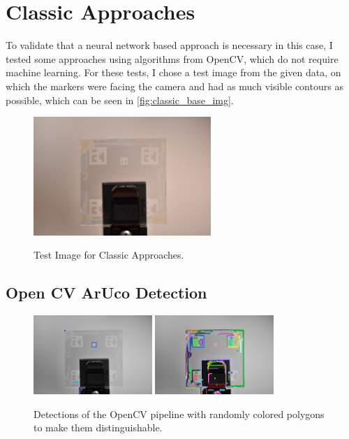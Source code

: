 \documentclass[10pt]{book}
\newcommand{\figureref}[1]{\autoref{#1}}
\begin{document}
\section{Classic Approaches}

To validate that a neural network based approach is necessary in this case, I tested some approaches using algorithms from \ac{OpenCV}, which do not require machine learning. For these tests, I chose a test image from the given data, on which the markers were facing the camera and had as much visible contours as possible, which can be seen in \figureref{fig:classic_base_img}. 

\begin{figure}
  \caption{Test Image for Classic Approaches.}
  \includegraphics[width=0.6\textwidth]{image/classic_base_img}
  \label{fig:classic_base_img}
\end{figure}

\subsection{Open CV ArUco Detection}

\begin{figure}
  \centering
     {\includegraphics[width=0.4\textwidth]{image/classic_base_img_opencv_det_small}}
     {\includegraphics[width=0.4\textwidth]{image/classic_base_img_opencv_det_all}}
  \caption{Detections of the \ac{OpenCV} pipeline with randomly colored polygons to make them distinguishable.}
  \label{fig:classic_base_img_opencv}
\end{figure}
\end{document}
